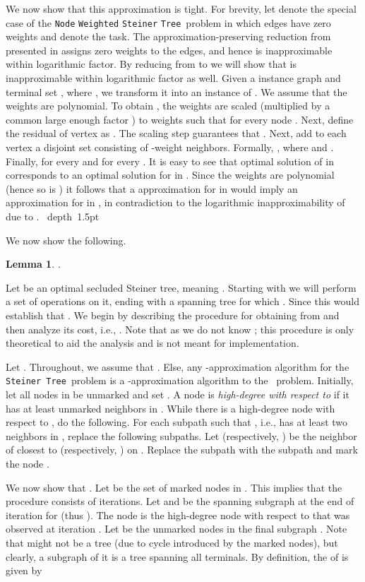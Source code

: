 \documentclass[12pt]{article}
\newtheorem{lemma}[theorem]{Lemma}
\def\Proof{\par\noindent{\bf Proof:~}}
\def\blackslug{\hbox{\hskip 1pt \vrule width 4pt height 8pt
    depth 1.5pt \hskip 1pt}}
\def\QED{\quad\blackslug\lower 8.5pt\null\par}
\newcommand{\PS}[0]{ 
}
\newcommand{\Steiner}[0]{\mbox{\tt Steiner Tree}}
\newcommand{\NodeSteiner}[0]{\mbox{\tt Node} \mbox{\tt Weighted}
\mbox{\tt Steiner} \mbox{\tt Tree}}
\begin{document}
We now show that this approximation is tight.
For brevity, let  denote the special case of the \NodeSteiner\ problem in which edges have zero weights and  denote the  task.
The approximation-preserving reduction from  presented in \cite{KleinR95} assigns zero weights to the edges, and hence  is inapproximable within logarithmic factor.  By reducing from  to  we will show that  is inapproximable within logarithmic factor as well. Given a  instance graph  and terminal set , where , we transform it into an instance  of . We assume that the weights are polynomial. To obtain , the weights  are scaled (multiplied by a common large enough factor ) to weights  such that  for every node . Next, define the residual of vertex  as . The scaling step guarantees that .
Next, add to each vertex  a disjoint set  consisting of -weight  neighbors. Formally, , where  and . Finally,   for every  and  for every . It is easy to see that optimal solution of  in  corresponds to an optimal solution for  in . Since the weights  are polynomial (hence so is ) it follows that a  approximation for   in  would imply an  approximation for   in , in contradiction to the logarithmic inapproximability of  due to \cite{KleinR95}.
\QED
We now show the following.
\begin{lemma}
\label{cl:degcost}
.
\end{lemma}
\Proof
Let  be an optimal secluded Steiner tree, meaning . Starting with  we will perform a set of operations on it, ending with a spanning  tree  for which . Since  this would establish that . We begin by describing the procedure for obtaining  from  and then analyze its cost, i.e.,  . Note that as we do not know ; this procedure is only theoretical to aid the analysis and is not meant for implementation.

Let . Throughout, we assume that . Else, any -approximation algorithm for the \Steiner\ problem is a -approximation algorithm to the \PS\ problem.
Initially, let all nodes in  be unmarked and set .
A node  is \emph{high-degree with respect to}  if it has at least  unmarked neighbors in . While there is a high-degree node  with respect to , do the following. For each subpath  such that , i.e.,  has at least two neighbors in , replace the following subpaths. Let  (respectively, ) be the neighbor of  closest to  (respectively, ) on . Replace the subpath  with the subpath  and mark the node .

We now show that . Let  be the set of marked nodes in . This implies that the procedure consists of  iterations. Let  and  be the spanning  subgraph at the end of iteration  for  (thus ). The node  is the high-degree node with respect to  that was observed at iteration . Let  be the unmarked nodes in the final subgraph . Note that  might not be a tree (due to cycle introduced by the marked nodes), but clearly, a subgraph of it is a  tree spanning all terminals. By definition, the  of  is given by
\end{document}
